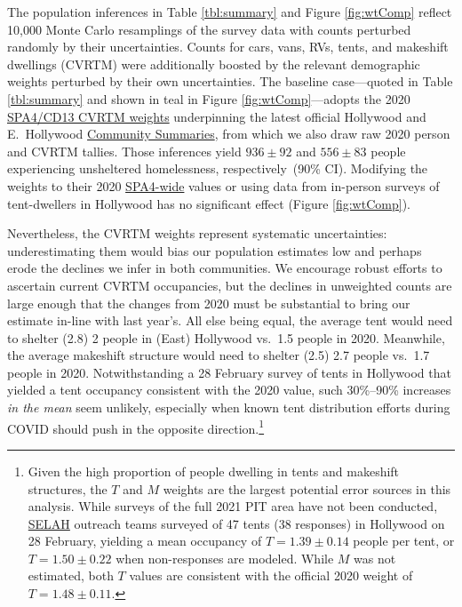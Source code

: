 \documentclass[11pt]{article}
\def\resp{respectively}
\def\selah{SELAH}
\begin{document}
 The population inferences in Table \ref{tbl:summary} and 
Figure \ref{fig:wtComp} reflect 10,000 Monte Carlo resamplings of the survey data with 
counts perturbed randomly by their uncertainties. Counts for cars, vans, RVs, tents, and 
makeshift dwellings (CVRTM) were additionally boosted by the relevant demographic weights 
perturbed by their own uncertainties. The baseline case---quoted in Table \ref{tbl:summary} and 
shown in teal in Figure \ref{fig:wtComp}---adopts the 2020 
\href{https://www.lahsa.org/documents?id=4635-usc-2018-2020-multipliers-and-estimates-overview}
{SPA4/CD13 CVRTM weights} underpinning the latest official Hollywood and E.~Hollywood 
\href{https://www.lahsa.org/documents?id=4686-2020-greater-los-angeles-city-community-homelessness-report-service-planning-area-4.pdf}
{Community Summaries}, from which we also draw raw 2020 person and CVRTM tallies. Those inferences yield 
$936\pm92$ and $556\pm83$ people experiencing unsheltered homelessness, \resp\ (90\% CI). Modifying the weights
to their 2020 \href{https://www.lahsa.org/documents?id=4693-2020-greater-los-angeles-homeless-count-cvrtm-conversion-factors}
{SPA4-wide} values or using data from in-person surveys of tent-dwellers in Hollywood has no
significant effect (Figure \ref{fig:wtComp}).

Nevertheless, the CVRTM weights represent systematic uncertainties: underestimating them would bias
our population estimates low and perhaps erode the declines we infer in both communities. We encourage robust
efforts to ascertain current CVRTM occupancies, but the declines in unweighted counts are large enough that 
the changes from 2020 must be substantial to bring our estimate in-line with last year's. All else being equal, 
the average tent would need to shelter (2.8) 2 people in (East) Hollywood vs.\ 1.5 people in 2020. Meanwhile, 
the average makeshift structure would need to shelter (2.5) 2.7 people vs.\ 1.7 people in 2020. Notwithstanding
a 28 February survey of tents in Hollywood that yielded a tent occupancy consistent with the 2020 value, 
such 30\%--90\% increases {\it in the mean} seem unlikely, especially when known tent distribution efforts 
during COVID should push in the opposite direction.\footnote{Given the high proportion of people dwelling in tents
and makeshift structures, the $T$ and $M$ weights are the largest potential error sources in this analysis. While 
surveys of the full 2021 PIT area have not been conducted, \href{https://selahnch.org}{\selah} outreach teams 
surveyed of 47 tents (38 responses) in Hollywood on 28 February, yielding a mean occupancy of 
$T=1.39\pm0.14$ people per tent, or $T=1.50\pm0.22$ when non-responses are modeled. While $M$ was
not estimated, both $T$ values are consistent with the official 2020 weight of $T=1.48\pm0.11$.}
\end{document}

